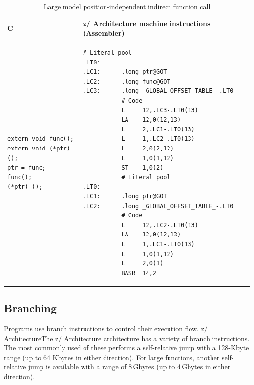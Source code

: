 \documentclass[USenglish,fontsize=11pt,twoside,%
  toc=bib,toc=idx,toc=graduated,numbers=noendperiod,
  bookmarks=true,
  bookmarksnumbered=true,
  bookmarksopen=true,
  bookmarksopenlevel=1,
  breaklinks=true,
  colorlinks=true,
  linkcolor=black,
  pdfpagelayout={TwoPageRight},
  pdfusetitle=true
]{scrreprt}
\newcommand{\ARCH}{z/\kern-1pt Ar\-chi\-tec\-ture}
\newcommand{\ARCH}{ESA/390}
\newenvironment{DIFnomarkup}{}{} %
\begin{document}
\ifzseries\else
\begin{table}
  \centering
  \begin{DIFnomarkup}
  \begin{tabular}{p{}p{}}
    \toprule
    C & \ARCH{} machine instructions (Assembler) \\
    \midrule
\begin{lstlisting}[style=short]
extern void func();
extern void (*ptr)();
ptr = func;
func();
(*ptr) ();
\end{lstlisting}
    &
\begin{lstlisting}[style=short,language=simpleasm]
           # Literal pool
.LT0:
.LC1:      .long ptr@GOT
.LC2:      .long func@GOT
.LC3:      .long _GLOBAL_OFFSET_TABLE_-.LT0
           # Code
           L     12,.LC3-.LT0(13)
           LA    12,0(12,13)
           L     2,.LC1-.LT0(13)
           L     1,.LC2-.LT0(13)
           L     2,0(2,12)
           L     1,0(1,12)
           ST    1,0(2)
           # Literal pool
.LT0:
.LC1:      .long ptr@GOT
.LC2:      .long _GLOBAL_OFFSET_TABLE_-.LT0
           # Code
           L     12,.LC2-.LT0(13)
           LA    12,0(12,13)
           L     1,.LC1-.LT0(13)
           L     1,0(1,12)
           L     2,0(1)
           BASR  14,2
\end{lstlisting} \\
  \end{tabular}
  \end{DIFnomarkup}
  \caption{Large model position-independent indirect function call}
  \label{tab:fncallpiclarge}
\end{table}
\fi

\subsection{Branching}
Programs use branch instructions to control their execution flow.
{\ifzseries \ARCH{}\else The \ARCH{} architecture\fi} has a
variety of branch instructions.  The most commonly used of these
performs a self-relative jump with a 128-Kbyte range (up to 64 Kbytes
in either direction).  {\ifzseries For large functions, another
  self-relative jump is available with a range of 8$\,$Gbytes (up to
  4$\,$Gbytes in either direction).\fi}%
\end{document}
